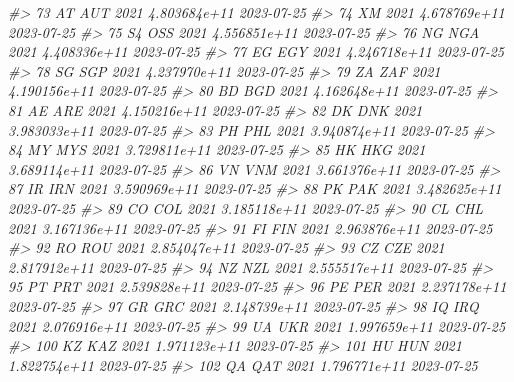 \documentclass[
  xelatex, ja=standard]{bxjsbook}
\newenvironment{Shaded}{\begin{snugshade}}{\end{snugshade}}
\newcommand{\CommentTok}[1]{\textcolor[rgb]{0.56,0.35,0.01}{\textit{#1}}}
\theoremstyle{definition}
\theoremstyle{definition}
\theoremstyle{definition}
\theoremstyle{definition}
\theoremstyle{remark}
\begin{document}
\begin{Shaded}
\begin{Highlighting}[]
\CommentTok{\#\textgreater{} 73     AT   AUT 2021 4.803684e+11         2023{-}07{-}25}
\CommentTok{\#\textgreater{} 74     XM       2021 4.678769e+11         2023{-}07{-}25}
\CommentTok{\#\textgreater{} 75     S4   OSS 2021 4.556851e+11         2023{-}07{-}25}
\CommentTok{\#\textgreater{} 76     NG   NGA 2021 4.408336e+11         2023{-}07{-}25}
\CommentTok{\#\textgreater{} 77     EG   EGY 2021 4.246718e+11         2023{-}07{-}25}
\CommentTok{\#\textgreater{} 78     SG   SGP 2021 4.237970e+11         2023{-}07{-}25}
\CommentTok{\#\textgreater{} 79     ZA   ZAF 2021 4.190156e+11         2023{-}07{-}25}
\CommentTok{\#\textgreater{} 80     BD   BGD 2021 4.162648e+11         2023{-}07{-}25}
\CommentTok{\#\textgreater{} 81     AE   ARE 2021 4.150216e+11         2023{-}07{-}25}
\CommentTok{\#\textgreater{} 82     DK   DNK 2021 3.983033e+11         2023{-}07{-}25}
\CommentTok{\#\textgreater{} 83     PH   PHL 2021 3.940874e+11         2023{-}07{-}25}
\CommentTok{\#\textgreater{} 84     MY   MYS 2021 3.729811e+11         2023{-}07{-}25}
\CommentTok{\#\textgreater{} 85     HK   HKG 2021 3.689114e+11         2023{-}07{-}25}
\CommentTok{\#\textgreater{} 86     VN   VNM 2021 3.661376e+11         2023{-}07{-}25}
\CommentTok{\#\textgreater{} 87     IR   IRN 2021 3.590969e+11         2023{-}07{-}25}
\CommentTok{\#\textgreater{} 88     PK   PAK 2021 3.482625e+11         2023{-}07{-}25}
\CommentTok{\#\textgreater{} 89     CO   COL 2021 3.185118e+11         2023{-}07{-}25}
\CommentTok{\#\textgreater{} 90     CL   CHL 2021 3.167136e+11         2023{-}07{-}25}
\CommentTok{\#\textgreater{} 91     FI   FIN 2021 2.963876e+11         2023{-}07{-}25}
\CommentTok{\#\textgreater{} 92     RO   ROU 2021 2.854047e+11         2023{-}07{-}25}
\CommentTok{\#\textgreater{} 93     CZ   CZE 2021 2.817912e+11         2023{-}07{-}25}
\CommentTok{\#\textgreater{} 94     NZ   NZL 2021 2.555517e+11         2023{-}07{-}25}
\CommentTok{\#\textgreater{} 95     PT   PRT 2021 2.539828e+11         2023{-}07{-}25}
\CommentTok{\#\textgreater{} 96     PE   PER 2021 2.237178e+11         2023{-}07{-}25}
\CommentTok{\#\textgreater{} 97     GR   GRC 2021 2.148739e+11         2023{-}07{-}25}
\CommentTok{\#\textgreater{} 98     IQ   IRQ 2021 2.076916e+11         2023{-}07{-}25}
\CommentTok{\#\textgreater{} 99     UA   UKR 2021 1.997659e+11         2023{-}07{-}25}
\CommentTok{\#\textgreater{} 100    KZ   KAZ 2021 1.971123e+11         2023{-}07{-}25}
\CommentTok{\#\textgreater{} 101    HU   HUN 2021 1.822754e+11         2023{-}07{-}25}
\CommentTok{\#\textgreater{} 102    QA   QAT 2021 1.796771e+11         2023{-}07{-}25}

\end{Highlighting}
\end{Shaded}
\end{document}

